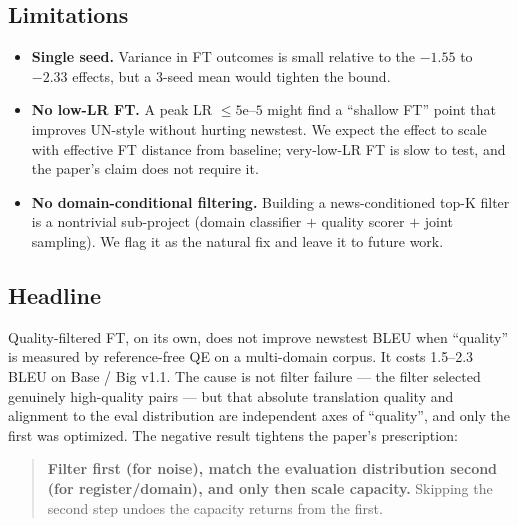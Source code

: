 \subsection{Limitations}
\begin{itemize}
\item \textbf{Single seed.} Variance in FT outcomes is small relative to the $-1.55$ to $-2.33$ effects, but a 3-seed mean would tighten the bound.
\item \textbf{No low-LR FT.} A peak LR $\leq 5\text{e--}5$ might find a ``shallow FT'' point that improves UN-style without hurting newstest. We expect the effect to scale with effective FT distance from baseline; very-low-LR FT is slow to test, and the paper's claim does not require it.
\item \textbf{No domain-conditional filtering.} Building a news-conditioned top-K filter is a nontrivial sub-project (domain classifier $+$ quality scorer $+$ joint sampling). We flag it as the natural fix and leave it to future work.
\end{itemize}

\subsection{Headline}
Quality-filtered FT, on its own, does not improve newstest BLEU when ``quality'' is measured by reference-free QE on a multi-domain corpus. It costs 1.5--2.3 BLEU on Base / Big v1.1. The cause is not filter failure --- the filter selected genuinely high-quality pairs --- but that absolute translation quality and alignment to the eval distribution are independent axes of ``quality'', and only the first was optimized. The negative result tightens the paper's prescription:

\begin{quote}
\textbf{Filter first (for noise), match the evaluation distribution second (for register/domain), and only then scale capacity.} Skipping the second step undoes the capacity returns from the first.
\end{quote}
